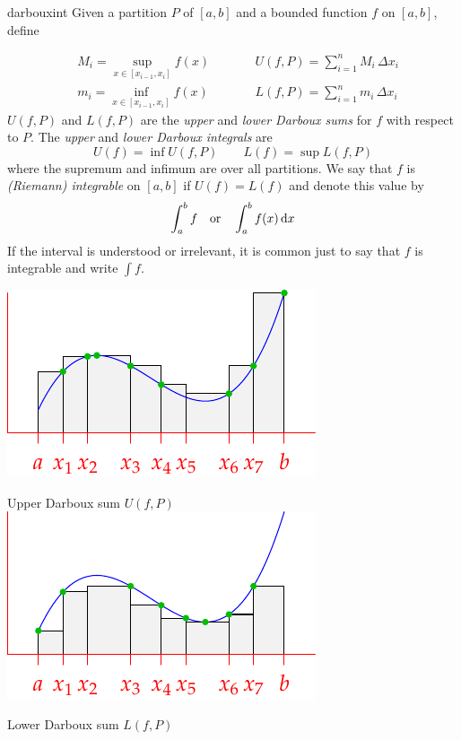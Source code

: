 \begin{defn}{}{darbouxint}
Given a partition $P$ of $[a,b]$ and a bounded function $f$ on $[a,b]$, define\par
\begin{minipage}[t]{0.6\linewidth}\vspace{-15pt}
\begin{align*}
&M_i=\!\!\sup_{x\in [x_{i-1},x_i]}\! f(x)\qquad &&U(f,P)=\sum_{i=1}^n M_i\,\Delta x_i\\
&m_i=\!\!\inf_{x\in [x_{i-1},x_i]}\! f(x) &&L(f,P)=\sum_{i=1}^n m_i\,\Delta x_i
\end{align*}
$U(f,P)$ and $L(f,P)$ are the \emph{upper} and \emph{lower Darboux sums} for $f$ with respect to $P$.
The \emph{upper} and \emph{lower Darboux integrals} are
\[U(f)=\inf U(f,P)\qquad L(f)=\sup L(f,P)\]
where the supremum and infimum are over all partitions.\smallbreak
We say that $f$ is \emph{(Riemann) integrable}  on $[a,b]$ if $U(f)=L(f)$ and denote this value by
\[\int_a^bf\quad\text{or}\quad\int_a^bf(x)\,{\mathrm{d} x}\]
If the interval is understood or irrelevant, it is common just to say that $f$ is integrable and write $\int f$.
\end{minipage}\begin{minipage}[t]{0.4\linewidth}\vspace{0pt}
\centering
\includegraphics{riemann-sum-upper}\par
Upper Darboux sum $U(f,P)$\bigbreak
\includegraphics{riemann-sum-lower}\par
Lower Darboux sum $L(f,P)$
\end{minipage}
\end{defn}


